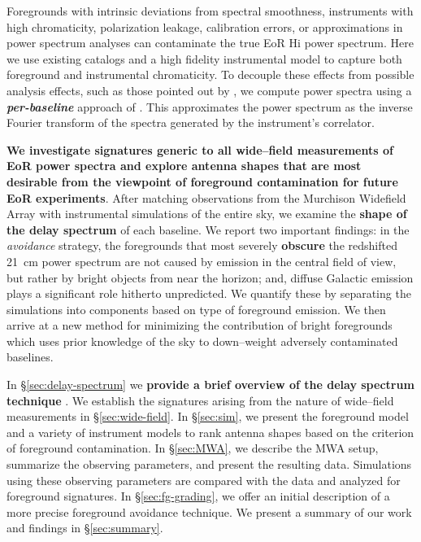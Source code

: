 \documentclass[preprint2,iop,numberedappendix]{emulateapj}
\begin{document}
Foregrounds with intrinsic deviations from spectral smoothness, instruments with high chromaticity, polarization leakage, calibration errors, or approximations in power spectrum analyses can contaminate the true EoR H{\sc i} power spectrum. Here we use existing catalogs and a high fidelity instrumental model to capture both foreground and instrumental chromaticity. To decouple these effects from possible analysis effects, such as those pointed out by \citet{haz13}, we compute power spectra using a {\it \textbf{per-baseline}} approach of \citet{par12b}. This approximates the power spectrum as the inverse Fourier transform of the spectra generated by the instrument's correlator. 

{\bf We investigate signatures generic to all wide--field measurements of EoR power spectra and explore antenna shapes that are most desirable from the viewpoint of foreground contamination for future EoR experiments}. After matching observations from the Murchison Widefield Array with instrumental simulations of the entire sky, we examine the {\bf shape of the delay spectrum} of each baseline. We report two important findings: in the {\it avoidance} strategy, the foregrounds that most severely {\bf obscure} the redshifted 21~cm power spectrum are not caused by emission in the central field of view, but rather by bright objects from near the horizon; and, diffuse Galactic emission plays a significant role hitherto unpredicted. We quantify these by separating the simulations into components based on type of foreground emission. We then arrive at a new method for minimizing the contribution of bright foregrounds which uses prior knowledge of the sky to down--weight adversely contaminated baselines. 

In \S\ref{sec:delay-spectrum} we {\bf provide a brief overview of the delay spectrum technique} \citep{par12a,par12b}. We establish the signatures arising from the nature of wide--field measurements in \S\ref{sec:wide-field}. In \S\ref{sec:sim}, we present the foreground model and a variety of instrument models to rank antenna shapes based on the criterion of foreground contamination. In \S\ref{sec:MWA}, we describe the MWA setup, summarize the observing parameters, and present the resulting data. Simulations using these observing parameters are compared with the data and analyzed for foreground signatures. In \S\ref{sec:fg-grading}, we offer an initial description of a more precise foreground avoidance technique. We present a summary of our work and findings in \S\ref{sec:summary}.
\end{document}
